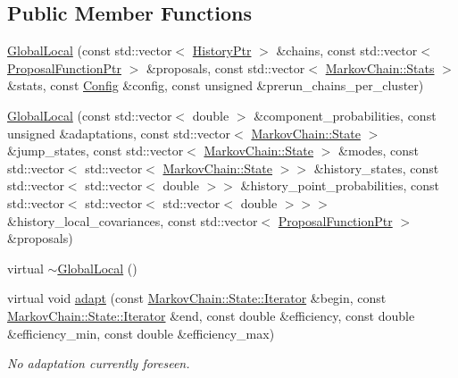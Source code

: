 \subsection*{Public Member Functions}
\begin{DoxyCompactItemize}
\item 
\hyperlink{classeos_1_1proposal__functions_1_1GlobalLocal_a09da326841b33c72b086dc04d9ba0c4a}{GlobalLocal} (const std::vector$<$ \hyperlink{namespaceeos_ac9f30fde04446cfabdd69d4b5b5d3c5a}{HistoryPtr} $>$ \&chains, const std::vector$<$ \hyperlink{namespaceeos_ae97f9891c67c90959a03fc96efaa4dc9}{ProposalFunctionPtr} $>$ \&proposals, const std::vector$<$ \hyperlink{structeos_1_1MarkovChain_1_1Stats}{MarkovChain::Stats} $>$ \&stats, const \hyperlink{structeos_1_1proposal__functions_1_1GlobalLocal_1_1Config}{Config} \&config, const unsigned \&prerun\_\-chains\_\-per\_\-cluster)
\item 
\hyperlink{classeos_1_1proposal__functions_1_1GlobalLocal_aee4ba010b2c73b484c28eaaf7d42057c}{GlobalLocal} (const std::vector$<$ double $>$ \&component\_\-probabilities, const unsigned \&adaptations, const std::vector$<$ \hyperlink{structeos_1_1MarkovChain_1_1State}{MarkovChain::State} $>$ \&jump\_\-states, const std::vector$<$ \hyperlink{structeos_1_1MarkovChain_1_1State}{MarkovChain::State} $>$ \&modes, const std::vector$<$ std::vector$<$ \hyperlink{structeos_1_1MarkovChain_1_1State}{MarkovChain::State} $>$$>$ \&history\_\-states, const std::vector$<$ std::vector$<$ double $>$$>$ \&history\_\-point\_\-probabilities, const std::vector$<$ std::vector$<$ std::vector$<$ double $>$$>$$>$ \&history\_\-local\_\-covariances, const std::vector$<$ \hyperlink{namespaceeos_ae97f9891c67c90959a03fc96efaa4dc9}{ProposalFunctionPtr} $>$ \&proposals)
\item 
virtual \hyperlink{classeos_1_1proposal__functions_1_1GlobalLocal_a31e2faf68a29cfc348905a8022a397e5}{$\sim$GlobalLocal} ()
\item 
virtual void \hyperlink{classeos_1_1proposal__functions_1_1GlobalLocal_aecea521f102e4f3c2fd0fad24b21b730}{adapt} (const \hyperlink{structeos_1_1MarkovChain_1_1State_ad7590843e4feca7e696c53863e6e10c1}{MarkovChain::State::Iterator} \&begin, const \hyperlink{structeos_1_1MarkovChain_1_1State_ad7590843e4feca7e696c53863e6e10c1}{MarkovChain::State::Iterator} \&end, const double \&efficiency, const double \&efficiency\_\-min, const double \&efficiency\_\-max)
\begin{DoxyCompactList}\small\item\em No adaptation currently foreseen. \item\end{DoxyCompactList}\item 

\end{DoxyCompactItemize}
